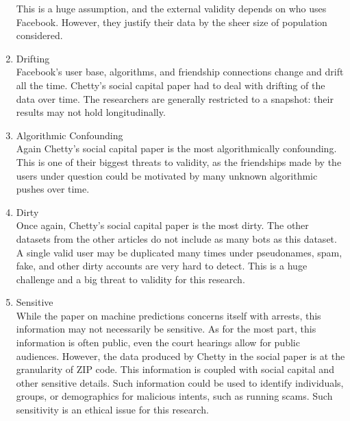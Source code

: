 \documentclass[../ass.tex]{subfiles}
\begin{document}
\begin{enumerate}
        This is a huge assumption, and the external validity depends on who uses Facebook. 
        However, they justify their data by the sheer size of population considered.
    \item Drifting \\
        Facebook's user base, algorithms, and friendship connections change and drift all the time. 
        Chetty's social capital paper \cite{social_cap} had to deal with drifting of the data over time. 
        The researchers are generally restricted to a snapshot: their results may not hold longitudinally. 
    \item Algorithmic Confounding \\
        Again Chetty's social capital paper \cite{social_cap} is the most algorithmically confounding. 
        This is one of their biggest threats to validity, as the friendships made by the users under question could be motivated by many unknown algorithmic pushes over time. 
    \item Dirty \\
        Once again, Chetty's social capital paper \cite{social_cap} is the most dirty. 
        The other datasets from the other articles do not include as many bots as this dataset. 
        A single valid user may be duplicated many times under pseudonames, spam, fake, and other dirty accounts are very hard to detect. 
        This is a huge challenge and a big threat to validity for this research. 
    \item Sensitive \\
        While the paper on machine predictions \cite{machine_pred} concerns itself with arrests, this information may not necessarily be sensitive.
        As for the most part, this information is often public, even the court hearings allow for public audiences.
        However, the data produced by Chetty in the social paper \cite{social_cap} is at the granularity of ZIP code. 
        This information is coupled with social capital and other sensitive details. 
        Such information could be used to identify individuals, groups, or demographics for malicious intents, such as running scams.
        Such sensitivity is an ethical issue for this research.
\end{enumerate}
\end{document}
